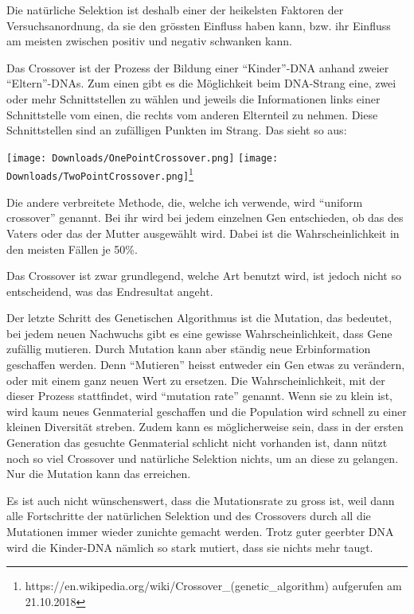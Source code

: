 \documentclass[11pt,a4paper,ngerman]{article}
\begin{document}
\bigskip
Die natürliche Selektion ist deshalb einer der heikelsten Faktoren der Versuchsanordnung, da sie den grössten Einfluss haben kann, bzw. ihr Einfluss am meisten zwischen positiv und negativ schwanken kann.

\bigskip
Das Crossover ist der Prozess der Bildung einer \enquote{Kinder}-DNA anhand zweier \enquote{Eltern}-DNAs. Zum einen gibt es die Möglichkeit beim DNA-Strang eine, zwei oder mehr Schnittstellen zu wählen und jeweils die Informationen links einer Schnittstelle vom einen, die rechts vom anderen Elternteil zu nehmen. Diese Schnittstellen sind an zufälligen Punkten im Strang. Das sieht so aus:

\begin{center}
\texttt{[image: Downloads/OnePointCrossover.png]}
\texttt{[image: Downloads/TwoPointCrossover.png]}\footnote{https://en.wikipedia.org/wiki/Crossover\_(genetic\_algorithm) aufgerufen am 21.10.2018}
\end{center}

Die andere verbreitete Methode, die, welche ich verwende, wird \enquote{uniform crossover} genannt. Bei ihr wird bei jedem einzelnen Gen entschieden, ob das des Vaters oder das der Mutter ausgewählt wird. Dabei ist die Wahrscheinlichkeit in den meisten Fällen je 50\%.

\bigskip
Das Crossover ist zwar grundlegend, welche Art benutzt wird, ist jedoch nicht so entscheidend, was das Endresultat angeht.

\bigskip
Der letzte Schritt des Genetischen Algorithmus ist die Mutation, das bedeutet, bei jedem neuen Nachwuchs gibt es eine gewisse Wahrscheinlichkeit, dass Gene zufällig mutieren. Durch Mutation kann aber ständig neue Erbinformation geschaffen werden. Denn \enquote{Mutieren} heisst entweder ein Gen etwas zu verändern, oder mit einem ganz neuen Wert zu ersetzen. Die Wahrscheinlichkeit, mit der dieser Prozess stattfindet, wird \enquote{mutation rate} genannt. Wenn sie zu klein ist, wird kaum neues Genmaterial geschaffen und die Population wird schnell zu einer kleinen Diversität streben. Zudem kann es möglicherweise sein, dass in der ersten Generation das gesuchte Genmaterial schlicht nicht vorhanden ist, dann nützt noch so viel Crossover und natürliche Selektion nichts, um an diese zu gelangen. Nur die Mutation kann das erreichen.

\bigskip
Es ist auch nicht wünschenswert, dass die Mutationsrate zu gross ist, weil dann alle Fortschritte der natürlichen Selektion und des Crossovers durch all die Mutationen immer wieder zunichte gemacht werden. Trotz guter geerbter DNA wird die Kinder-DNA nämlich so stark mutiert, dass sie nichts mehr taugt.
\end{document}
